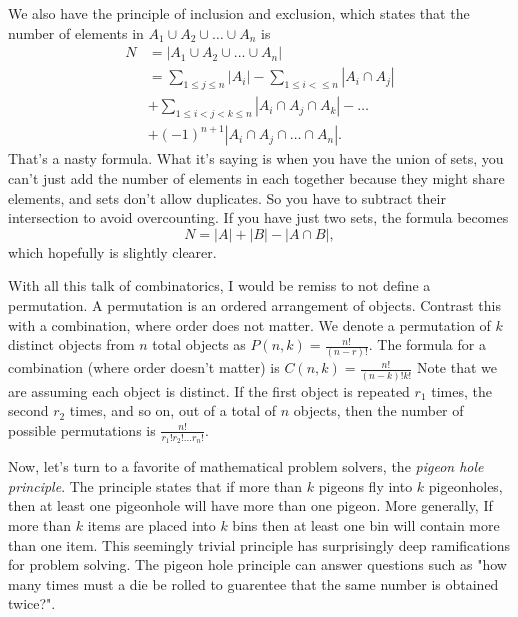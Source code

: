 \documentclass[nobib]{tufte-handout}
\begin{document}
We also have the principle of inclusion and exclusion, which states 
that the number of elements in $A_1 \cup A_2 \cup \dots \cup A_n$ is
\begin{align*}
    N &= |A_1 \cup A_2 \cup \dots \cup A_n| \\
    &= \sum_{1 \leq j \leq n} |A_i| - \sum_{1 \leq i < \leq n} |A_i \cap A_j| \\
    &+ \sum_{1 \leq i < j < k \leq n} |A_i \cap A_j \cap A_k| - \dots \\
    &+ (-1)^{n+1} |A_i \cap A_j \cap \dots \cap A_n|.
\end{align*} 
That's a nasty formula. What it's saying is when you have the union of sets, 
you can't just add the number of elements in each together because 
they might share elements, and sets don't allow duplicates. So you have 
to subtract their intersection to avoid overcounting. 
If you have just two sets, the formula becomes 
\[N = |A| + |B| - |A \cap B|,\]
which hopefully is slightly clearer. 

With all this talk of combinatorics, I would be remiss to not define
a permutation. A permutation is an ordered arrangement of objects.
Contrast this with a combination, where order does not matter. 
We denote a permutation of $k$ distinct objects from $n$ total 
objects as $P(n,k) = \frac{n!}{(n-r)!}$. The formula for a
combination (where order doesn't matter) is $C(n,k) = \frac{n!}{(n-k)!k!}$
Note that we are assuming each object is distinct. If the first object 
is repeated $r_1$ times, the second $r_2$ times, and so on, out of 
a total of $n$ objects, then the number of possible permutations is 
$\frac{n!}{r_1!r_2!\dots r_n!}$.

Now, let's turn to a favorite of mathematical problem solvers, 
the \emph{pigeon hole principle}. The principle states that 
if more than $k$ pigeons fly into $k$
pigeonholes, then at least one pigeonhole
will have more than one pigeon. More generally,
If more than $k$ items are placed into $k$ bins
then at least one bin will contain more than
one item. This seemingly trivial principle has 
surprisingly deep ramifications for problem solving. 
The pigeon hole principle can answer questions such 
as "how many times must a die be rolled to guarentee
that the same number is obtained twice?".
\end{document}
